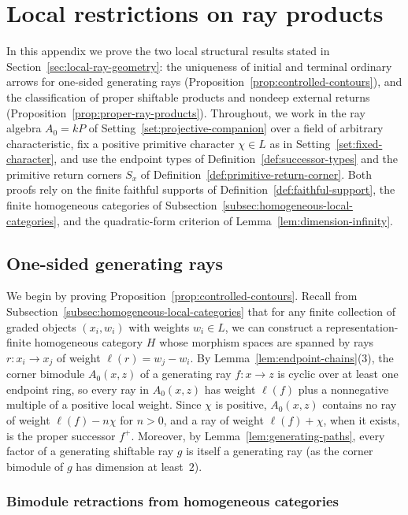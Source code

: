 \section{Local restrictions on ray products}
\label{app:local-rays}

In this appendix we prove the two local structural results stated in Section~\ref{sec:local-ray-geometry}: the uniqueness of initial and terminal ordinary arrows for one-sided generating rays (Proposition~\ref{prop:controlled-contours}), and the classification of proper shiftable products and nondeep external returns (Proposition~\ref{prop:proper-ray-products}). Throughout, we work in the ray algebra $A_0=kP$ of Setting~\ref{set:projective-companion} over a field of arbitrary characteristic, fix a positive primitive character $\chi\in L$ as in Setting~\ref{set:fixed-character}, and use the endpoint types of Definition~\ref{def:successor-types} and the primitive return corners $S_x$ of Definition~\ref{def:primitive-return-corner}. Both proofs rely on the finite faithful supports of Definition~\ref{def:faithful-support}, the finite homogeneous categories of Subsection~\ref{subsec:homogeneous-local-categories}, and the quadratic-form criterion of Lemma~\ref{lem:dimension-infinity}.

\subsection{One-sided generating rays}
\label{app:controlled-contours}

We begin by proving Proposition~\ref{prop:controlled-contours}. Recall from Subsection~\ref{subsec:homogeneous-local-categories} that for any finite collection of graded objects $(x_i,w_i)$ with weights $w_i\in L$, we can construct a representation-finite homogeneous category $H$ whose morphism spaces are spanned by rays $r\colon x_i\to x_j$ of weight $\ell(r)=w_j-w_i$. By Lemma~\ref{lem:endpoint-chains}(3), the corner bimodule $A_0(x,z)$ of a generating ray $f\colon x\to z$ is cyclic over at least one endpoint ring, so every ray in $A_0(x,z)$ has weight $\ell(f)$ plus a nonnegative multiple of a positive local weight. Since $\chi$ is positive, $A_0(x,z)$ contains no ray of weight $\ell(f)-n\chi$ for $n>0$, and a ray of weight $\ell(f)+\chi$, when it exists, is the proper successor $f^+$. Moreover, by Lemma~\ref{lem:generating-paths}, every factor of a generating shiftable ray $g$ is itself a generating ray (as the corner bimodule of $g$ has dimension at least~$2$).

\subsubsection{Bimodule retractions from homogeneous categories}

